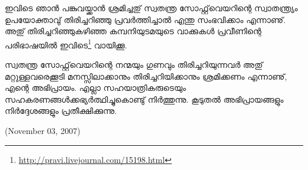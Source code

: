 ഇവിടെ ഞാന്‍ പങ്കുവയ്ക്കാന്‍ ശ്രമിച്ചതു് സ്വതന്ത്ര സോഫ്റ്റ്‌വെയറിന്റെ സ്വാതന്ത്ര്യം ഉപയോക്താവു് തിരിച്ചറിഞ്ഞു പ്രവര്‍ത്തിച്ചാല്‍ എന്തു സംഭവിക്കാം എന്നാണു്. അതു് തിരിച്ചറിഞ്ഞുകഴിഞ്ഞ കമ്പനിയുടമയുടെ വാക്കുകള്‍ പ്രവീണിന്റെ പരിഭാഷയില്‍ ഇവിടെ\footnote{\url{http://pravi.livejournal.com/15198.html}} വായിക്കൂ.

സ്വതന്ത്ര സോഫ്റ്റ്‌വെയറിന്റെ നന്മയും ഗുണവും തിരിച്ചറിയുന്നവര്‍ അതു് മറ്റുള്ളവരെക്കൂടി മനസ്സിലാക്കാനും തിരിച്ചറിയിക്കാനും ശ്രമിക്കണം എന്നാണു്, എന്റെ അഭിപ്രായം. 
എല്ലാ സഹയാത്രികരുടെയും സഹകരണങ്ങള്‍ക്കഭ്യര്‍ത്ഥിച്ചുകൊണ്ടു് നിര്‍ത്തുന്നു. കൂടുതല്‍ അഭിപ്രായങ്ങളും നിര്‍ദ്ദേശങ്ങളും പ്രതീക്ഷിക്കുന്നു.

\hspace*{2em}(November 03, 2007)
\newpage
